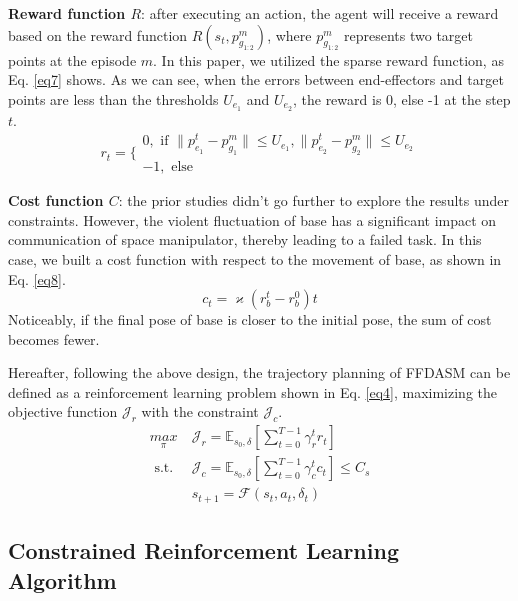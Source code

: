 \documentclass{article}
\begin{document}
\textbf{Reward  function $R$}: after executing an action, the agent will receive a reward based on the reward function $R(s_t,p^m_{g_{1:2}})$, where $p^m_{g_{1:2}}$ represents two target points at the episode $m$. In this paper, we utilized the sparse reward function, as Eq. \eqref{eq7} shows. As we can see, when the errors between end-effectors and target points are less than the thresholds $U_{e_{1}}$ and $U_{e_{2}}$, the reward is 0, else -1 at the step $t$. 
\begin{equation}
  \label{eq7}
    r_{t}=\{\begin{array}{c}
0, \text { if }\|p^{t}_{e_1}-p^m_{g_1}\| \leq U_{e_1}, \|p^{t}_{e_2}-p^m_{g_2}\| \leq U_{e_2} \\ 
-1, \text { else }
\end{array}  
\end{equation}


\textbf{Cost function $C$}: the prior studies \cite{2020Reinforcement,li2021constrained} didn't go further to explore the results under constraints. However, the violent fluctuation of base has a significant impact on communication of space manipulator, thereby leading to a failed task. In this case, we built a cost function with respect to the movement of base, as shown in Eq. \eqref{eq8}.
\begin{equation}
  \label{eq8}
c_t = \varkappa (r^t_{b}- r^0_{b})t
\end{equation}
Noticeably, if the final pose of base is closer to the initial pose, the sum of cost becomes fewer. 

Hereafter, following the above design, the trajectory planning of FFDASM can be defined as a reinforcement learning problem shown in Eq. \eqref{eq4}, maximizing the objective function $\mathcal J_r $ with the constraint $\mathcal J_c$.
\begin{equation}
  \label{eq9}
\begin{split}
\underset{\pi}{max} \ &\mathcal J_r = {\mathbb E}_{s_0,\delta} [\sum_{t=0}^{T-1} \gamma_r^t r_t]\\ 
\text { s.t. } &\mathcal J_c = {\mathbb E}_{s_0,\delta} [\sum_{t=0}^{T-1} \gamma_c^t c_t]\leq C_s \\
&s_{t+1} = \mathcal {F}(s_t,a_t,\delta_t)
\end{split}
\end{equation}


\subsection{Constrained Reinforcement Learning Algorithm}
\end{document}
